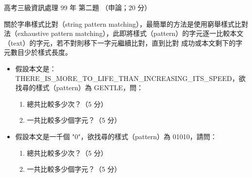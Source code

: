 \begin{pastexam}[label={px:gk3-099-ds-02}]{高考三級資訊處理 99 年 第二題}
（申論；20 分）

關於字串樣式比對（string pattern matching），最簡單的方法是使用窮舉樣式比對法（exhaustive pattern
matching），此即將樣式（pattern）的字元逐一比較本文（text）的字元，若不對則移下一字元繼續比對，直到比對
成功或本文剩下的字元數目少於樣式長度。
\begin{itemize}[leftmargin=2.2em]
\item[㈠] 假設本文是：THERE\_IS\_MORE\_TO\_LIFE\_THAN\_INCREASING\_ITS\_SPEED，欲找尋的樣式（pattern）為
GENTLE，問：
\begin{enumerate}[label=\arabic*.]
\item 總共比較多少次？（5 分）
\item 一共比較多少個字元？（5 分）
\end{enumerate}
\item[㈡] 假設本文是一千個 "0"，欲找尋的樣式（pattern）為 01010，請問：
\begin{enumerate}[label=\arabic*.]
\item 總共比較多少次？（5 分）
\item 一共比較多少個字元？（5 分）
\end{enumerate}
\end{itemize}
\end{pastexam}

